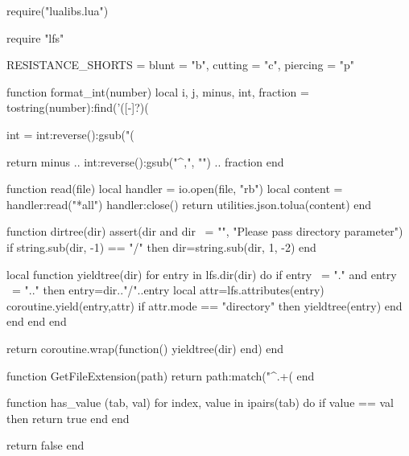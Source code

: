 \begin{luacode}
	require("lualibs.lua")

    require "lfs"

	RESISTANCE_SHORTS = {blunt = "b", cutting = "c", piercing = "p"}

    function format_int(number)
        local i, j, minus, int, fraction = tostring(number):find('([-]?)(%

        int = int:reverse():gsub("(%

        return minus .. int:reverse():gsub("^,", "") .. fraction
    end

	function read(file)
		local handler = io.open(file, "rb")
		local content = handler:read("*all")
		handler:close()
		return utilities.json.tolua(content)
	end

    function dirtree(dir)
        assert(dir and dir ~= "", "Please pass directory parameter")
        if string.sub(dir, -1) == "/" then
            dir=string.sub(dir, 1, -2)
        end

        local function yieldtree(dir)
            for entry in lfs.dir(dir) do
                if entry ~= "." and entry ~= ".." then
                    entry=dir.."/"..entry
                    local attr=lfs.attributes(entry)
                    coroutine.yield(entry,attr)
                    if attr.mode == "directory" then
                        yieldtree(entry)
                    end
                end
            end
        end

        return coroutine.wrap(function() yieldtree(dir) end)
    end

    function GetFileExtension(path)
        return path:match("^.+(%
    end

    function has_value (tab, val)
        for index, value in ipairs(tab) do
            if value == val then
                return true
            end
        end

        return false
    end
\end{luacode}